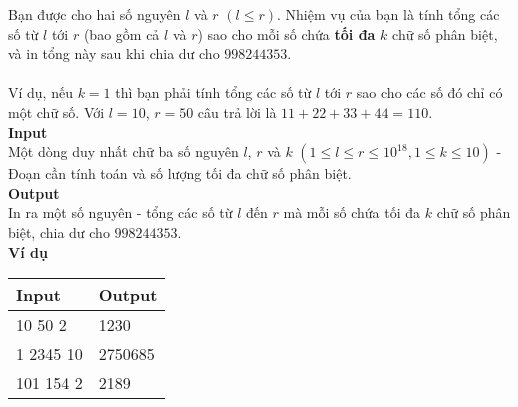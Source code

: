 Bạn được cho hai số nguyên $l$ và $r$ $(l \leq r)$. Nhiệm vụ của bạn là tính tổng các số từ $l$ tới $r$ (bao gồm cả $l$ và $r$) sao cho mỗi số chứa \textbf{tối đa} $k$ chữ số phân biệt, và in tổng này sau khi chia dư cho $998244353$.
\\
\\
Ví dụ, nếu $k = 1$ thì bạn phải tính tổng các số từ $l$ tới $r$ sao cho các số đó chỉ có một chữ số. Với $l = 10$, $r = 50$ câu trả lời là $11 + 22 + 33 + 44 = 110$.
\\

\textbf{Input}
\\
Một dòng duy nhất chữ ba số nguyên $l$, $r$ và $k$ $(1 \leq l \leq r \leq 10^{18}, 1 \leq k \leq 10)$ - Đoạn cần tính toán và số lượng tối đa chữ số phân biệt.
\\

\textbf{Output}
\\
In ra một số nguyên - tổng các số từ $l$ đến $r$ mà mỗi số chứa tối đa $k$ chữ số phân biệt, chia dư cho $998244353$.
\\

\textbf{Ví dụ}
\begin{table}[h!]
    \begin{center}
        \begin{tabular}{|p{6cm}|p{6cm}|}
            \hline
            \textbf{Input} & \textbf{Output} \\ 
            \hline
            10 50 2 & 1230 \\
            \hline
            1 2345 10 & 2750685  \\
            \hline
            101 154 2 & 2189 \\
            \hline
        \end{tabular}
    \end{center}
\end{table}



